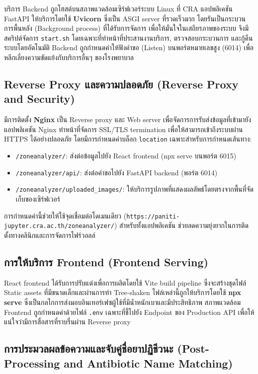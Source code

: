 บริการ Backend ถูกโฮสต์บนสภาพแวดล้อมเซิร์ฟเวอร์ระบบ Linux ที่ CRA แอปพลิเคชัน FastAPI ให้บริการโดยใช้ \textbf{Uvicorn} ซึ่งเป็น ASGI server ที่รวดเร็วมาก โดยรันเป็นกระบวนการพื้นหลัง (Background process) ที่ได้รับการจัดการ เพื่อให้มั่นใจในเสถียรภาพของระบบ จึงมีสคริปต์จัดการ \texttt{start.sh} โดยเฉพาะที่ทำหน้าที่ประสานงานบริการ, ตรวจสอบกระบวนการ และกู้คืนระบบโดยอัตโนมัติ Backend ถูกกำหนดค่าให้ฟังคำขอ (Listen) บนพอร์ตหมายเลขสูง (6014) เพื่อหลีกเลี่ยงความขัดแย้งกับบริการอื่นๆ ของโรงพยาบาล

\subsection{Reverse Proxy และความปลอดภัย (Reverse Proxy and Security)}

มีการติดตั้ง \textbf{Nginx} เป็น Reverse proxy และ Web server เพื่อจัดการการรับส่งข้อมูลที่เข้ามายังแอปพลิเคชัน Nginx ทำหน้าที่จัดการ SSL/TLS termination เพื่อให้สามารถเข้าถึงระบบผ่าน HTTPS ได้อย่างปลอดภัย โดยมีการกำหนดค่าบล็อก \texttt{location} เฉพาะสำหรับการกำหนดเส้นทาง:
\begin{itemize}
    \item \texttt{/zoneanalyzer/}: ส่งต่อข้อมูลไปยัง React frontend (npx serve บนพอร์ต 6015)
    \item \texttt{/zoneanalyzer/api/}: ส่งต่อคำขอไปยัง FastAPI backend (พอร์ต 6014)
    \item \texttt{/zoneanalyzer/uploaded\_images/}: ให้บริการรูปภาพที่แสดงผลลัพธ์โดยตรงจากพื้นที่จัดเก็บของเซิร์ฟเวอร์
\end{itemize}
การกำหนดค่านี้ช่วยให้ใช้จุดเชื่อมต่อโดเมนเดียว (\texttt{https://paniti-jupyter.cra.ac.th/zoneanalyzer/}) สำหรับทั้งแอปพลิเคชัน ช่วยลดความยุ่งยากในการติดตั้งทางคลินิกและการจัดการไฟร์วอลล์

\subsection{การให้บริการ Frontend (Frontend Serving)}

React frontend ได้รับการปรับแต่งเพื่อการผลิตโดยใช้ Vite build pipeline ซึ่งจะสร้างชุดไฟล์ Static assets ที่มีขนาดเล็กและผ่านการทำ Tree-shaken ไฟล์เหล่านี้ถูกให้บริการโดยใช้ \textbf{npx serve} ซึ่งเป็นกลไกการส่งมอบอินเทอร์เฟซผู้ใช้ที่มีน้ำหนักเบาและมีประสิทธิภาพ สภาพแวดล้อม Frontend ถูกกำหนดค่าด้วยไฟล์ \texttt{.env} เฉพาะที่ชี้ไปยัง Endpoint ของ Production API เพื่อให้แน่ใจว่ามีการสื่อสารที่ราบรื่นผ่าน Reverse proxy

\subsection{การประมวลผลข้อความและจับคู่ชื่อยาปฏิชีวนะ (Post-Processing and Antibiotic Name Matching)}

